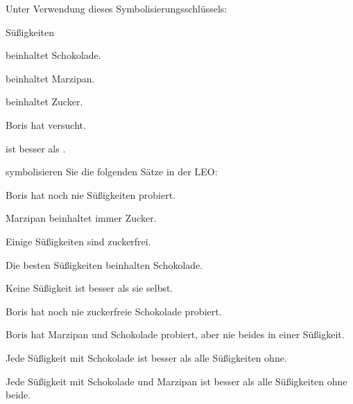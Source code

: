 \problempart
\label{pr.QLcandies}
Unter Verwendung dieses Symbolisierungsschlüssels:
\begin{ekey}
\item[\text{Domäne}] Sü{\ss}igkeiten
\item[\atom{S}{x}]  beinhaltet Schokolade.
\item[\atom{M}{x}]  beinhaltet Marzipan.
\item[\atom{Z}{x}]  beinhaltet Zucker.
\item[\atom{V}{x}] Boris hat  versucht.
\item[\atom{B}{x,y}]  ist besser als .
\end{ekey}
symbolisieren Sie die folgenden Sätze in der LEO:
\begin{earg}
\item Boris hat noch nie Sü{\ss}igkeiten probiert.
\item Marzipan beinhaltet immer Zucker.
\item Einige Sü{\ss}igkeiten sind zuckerfrei.
\item Die besten Sü{\ss}igkeiten beinhalten Schokolade.
\item Keine Sü{\ss}igkeit ist besser als sie selbst.
\item Boris hat noch nie zuckerfreie Schokolade probiert.
\item Boris hat Marzipan und Schokolade probiert, aber nie beides in einer Sü{\ss}igkeit.
\item Jede Sü{\ss}igkeit mit Schokolade ist besser als alle Sü{\ss}igkeiten ohne.
\item Jede Sü{\ss}igkeit mit Schokolade und Marzipan ist besser als alle Sü{\ss}igkeiten ohne beide.
\end{earg}


